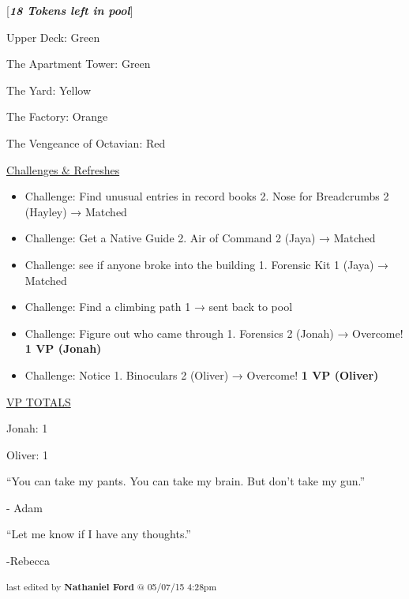 {[}\textit{\textbf{18 Tokens left in pool}}{]}



Upper Deck: Green

The Apartment Tower: Green

The Yard: Yellow

The Factory: Orange

The Vengeance of Octavian: Red



\underline{  {\LARGE Challenges \& Refreshes }  }



\begin{itemize}
\item Challenge: Find unusual entries in record books 2.  Nose for Breadcrumbs 2 (Hayley) → Matched
\item Challenge: Get a Native Guide 2.  Air of Command 2 (Jaya) → Matched
\item Challenge: see if anyone broke into the building 1. Forensic Kit 1 (Jaya) → Matched
\item Challenge: Find a climbing path 1 → sent back to pool
\item Challenge: Figure out who came through 1.  Forensics 2 (Jonah) → Overcome! \textbf{1 VP (Jonah)}
\item Challenge: Notice 1.  Binoculars 2 (Oliver) → Overcome! \textbf{1 VP (Oliver)}
\end{itemize}



\underline{  {\LARGE VP TOTALS }  }

Jonah: 1

Oliver: 1



``You can take my pants.  You can take my brain.  But don't take my gun.''

        - Adam



``Let me know if I have any thoughts.''

        -Rebecca


\iffalse

======================
THESE ARE ERRORS ENCOUNTERED DURING THE EXPORT PROCESS
======================

	Unable to highlight for footnote: Insert description of pistols here. because:GivenExpectedThese are Gauss pistols.These are Gaussian pistols.


\fi

\vspace{\fill}

\begin{flushright}
\textsubscript{last edited by \textbf{Nathaniel Ford} @ 05/07/15 4:28pm}
\end{flushright}

